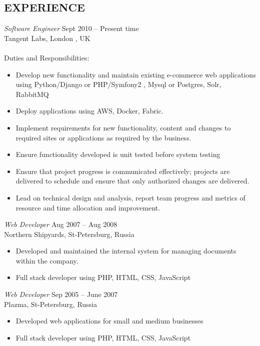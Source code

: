 \documentclass[margin]{res}
\begin{document}
\begin{resume}
\section{EXPERIENCE} {\sl Software Engineer} \hfill Sept 2010 – Present time \\
                Tangent Labs, London , UK \\ \\
                Duties and Responsibilities:
                \begin{itemize} \itemsep -2pt
                    \item Develop new functionality and maintain existing e-commerce web applications using Python/Django or PHP/Symfony2 , Mysql or Postgres, Solr, RabbitMQ
                    \item Deploy applications using AWS, Docker, Fabric.
                    \item Implement requirements for new functionality, content and changes to required sites or applications as required by the business.
                    \item Ensure functionality developed is unit tested before system testing
                    \item Ensure that project progress is communicated effectively; projects are delivered to schedule and ensure that only authorized changes are delivered. 
                    \item Lead on technical design and analysis, report team progress and metrics of resource and time allocation and improvement. 
                \end{itemize}

                {\sl Web Developer} \hfill            Aug 2007 – Aug 2008 \\
                Northern Shipyards, St-Petersburg, Russia \\
                \begin{itemize} \itemsep -2pt
                    \item Developed and maintained the internal system for managing documents within the company.
                    \item Full stack developer using PHP, HTML, CSS, JavaScript
                \end{itemize}

                {\sl Web Developer} \hfill        Sep 2005 – June 2007 \\
                Plazma, St-Petersburg, Russia \\
                \begin{itemize} \itemsep -2pt
                    \item Developed web applications for small and medium businesses
                    \item  Full stack developer using PHP, HTML, CSS, JavaScript
                \end{itemize}

\end{resume}
\end{document}
